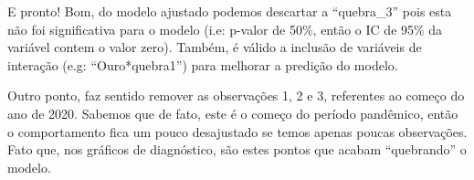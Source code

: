 \documentclass[
  letterpaper,
  DIV=11,
  numbers=noendperiod]{scrartcl}
\begin{document}
E pronto! Bom, do modelo ajustado podemos descartar a ``quebra\_3'' pois
esta não foi significativa para o modelo (i.e: p-valor de 50\%, então o
IC de 95\% da variável contem o valor zero). Também, é válido a inclusão
de variáveis de interação (e.g: ``Ouro*quebra1'') para melhorar a
predição do modelo.

Outro ponto, faz sentido remover as observações 1, 2 e 3, referentes ao
começo do ano de 2020. Sabemos que de fato, este é o começo do período
pandêmico, então o comportamento fica um pouco desajustado se temos
apenas poucas observações. Fato que, nos gráficos de diagnóstico, são
estes pontos que acabam ``quebrando'' o modelo.
\end{document}

